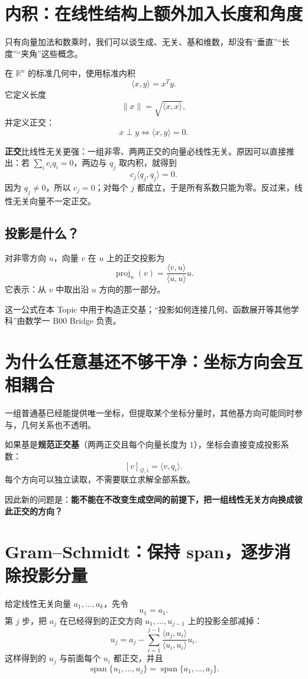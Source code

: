 \documentclass[11pt,a4paper]{ctexart}
\newcommand{\kw}[1]{\textbf{\color{deep}#1}}
\begin{document}
\section{内积：在线性结构上额外加入长度和角度}

只有向量加法和数乘时，我们可以谈生成、无关、基和维数，却没有“垂直”“长度”“夹角”这些概念。

在 $\mathbb R^n$ 的标准几何中，使用标准内积
\[
\langle x,y\rangle=x^Ty.
\]
它定义长度
\[
\|x\|=\sqrt{\langle x,x\rangle},
\]
并定义正交：
\[
x\perp y\iff \langle x,y\rangle=0.
\]

\kw{正交}比线性无关更强：一组非零、两两正交的向量必线性无关。原因可以直接推出：若 $\sum_i c_iq_i=0$，两边与 $q_j$ 取内积，就得到
\[
c_j\langle q_j,q_j\rangle=0.
\]
因为 $q_j\neq0$，所以 $c_j=0$；对每个 $j$ 都成立，于是所有系数只能为零。反过来，线性无关向量不一定正交。

\subsection{投影是什么？}

对非零方向 $u$，向量 $v$ 在 $u$ 上的正交投影为
\[
\operatorname{proj}_u(v)
=\frac{\langle v,u\rangle}{\langle u,u\rangle}u.
\]
它表示：从 $v$ 中取出沿 $u$ 方向的那一部分。

这一公式在本 Topic 中用于构造正交基；“投影如何连接几何、函数展开等其他学科”由数学一 B00 Bridge 负责。

\section{为什么任意基还不够干净：坐标方向会互相耦合}

一组普通基已经能提供唯一坐标，但提取某个坐标分量时，其他基方向可能同时参与，几何关系也不透明。

如果基是\kw{规范正交基}（两两正交且每个向量长度为 $1$），坐标会直接变成投影系数：
\[
[v]_{\mathcal Q,i}=\langle v,q_i\rangle.
\]
每个方向可以独立读取，不需要联立求解全部系数。

因此新的问题是：\kw{能不能在不改变生成空间的前提下，把一组线性无关方向换成彼此正交的方向？}

\section{Gram--Schmidt：保持 span，逐步消除投影分量}

给定线性无关向量 $a_1,\dots,a_k$，先令
\[
u_1=a_1.
\]
第 $j$ 步，把 $a_j$ 在已经得到的正交方向 $u_1,\dots,u_{j-1}$ 上的投影全部减掉：
\[
\boxed{
u_j
=a_j-\sum_{i=1}^{j-1}
\frac{\langle a_j,u_i\rangle}{\langle u_i,u_i\rangle}u_i.}
\]
这样得到的 $u_j$ 与前面每个 $u_i$ 都正交，并且
\[
\operatorname{span}\{u_1,\dots,u_j\}
=\operatorname{span}\{a_1,\dots,a_j\}.
\]
\end{document}
